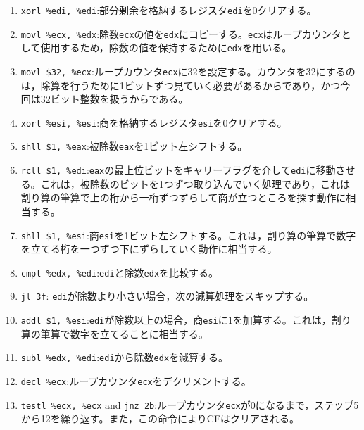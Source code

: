 \documentclass[a4paper]{jsarticle}
\newcommand{\var}[1]{\texttt{#1}}
\begin{document}
\begin{enumerate}
\item \var{xorl \%edi, \%edi}:部分剰余を格納するレジスタ\var{edi}を0クリアする。
\item \var{movl \%ecx, \%edx}:除数\var{ecx}の値を\var{edx}にコピーする。\var{ecx}はループカウンタとして使用するため，除数の値を保持するために\var{edx}を用いる。
\item \var{movl \$32, \%ecx}:ループカウンタ\var{ecx}に32を設定する。カウンタを32にするのは，除算を行うために1ビットずつ見ていく必要があるからであり，かつ今回は32ビット整数を扱うからである。
\item \var{xorl \%esi, \%esi}:商を格納するレジスタ\var{esi}を0クリアする。
\item \var{shll \$1, \%eax}:被除数\var{eax}を1ビット左シフトする。
\item \var{rcll \$1, \%edi}:\var{eax}の最上位ビットをキャリーフラグを介して\var{edi}に移動させる。これは，被除数のビットを1つずつ取り込んでいく処理であり，これは割り算の筆算で上の桁から一桁ずつずらして商が立つところを探す動作に相当する。
\item \var{shll \$1, \%esi}:商\var{esi}を1ビット左シフトする。これは，割り算の筆算で数字を立てる桁を一つずつ下にずらしていく動作に相当する。
\item \var{cmpl \%edx, \%edi}:\var{edi}と除数\var{edx}を比較する。
\item \var{jl 3f}:
\var{edi}が除数より小さい場合，次の減算処理をスキップする。
\item \var{addl \$1, \%esi}:\var{edi}が除数以上の場合，商\var{esi}に1を加算する。これは，割り算の筆算で数字を立てることに相当する。
\item \var{subl \%edx, \%edi}:\var{edi}から除数\var{edx}を減算する。
\item \var{decl \%ecx}:ループカウンタ\var{ecx}をデクリメントする。
\item \var{testl \%ecx, \%ecx} and \var{jnz 2b}:ループカウンタ\var{ecx}が0になるまで，ステップ5から12を繰り返す。また，この命令によりCFはクリアされる。
\end{enumerate}
\end{document}
